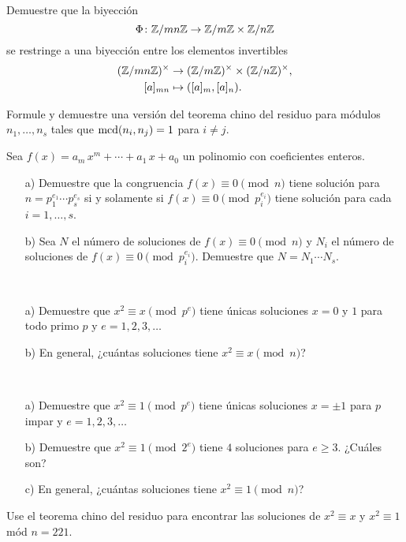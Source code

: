 \documentclass{article}
\begin{document}
\begin{problema}
  \label{probl:crt-invertibles}
  Demuestre que la biyección
  $$\Phi\colon \mathbb{Z}/mn\mathbb{Z} \to \mathbb{Z}/m\mathbb{Z} \times \mathbb{Z}/n\mathbb{Z}$$
  se restringe a una biyección entre los elementos invertibles
  \begin{align*}
    (\mathbb{Z}/mn\mathbb{Z})^\times & \to (\mathbb{Z}/m\mathbb{Z})^\times \times (\mathbb{Z}/n\mathbb{Z})^\times, \\
    [a]_{mn} & \mapsto ([a]_m, [a]_n).
  \end{align*}
\end{problema}

\begin{problema}
  Formule y demuestre una versión del teorema chino del residuo para módulos
  $n_1, \ldots, n_s$ tales que $\operatorname{mcd} (n_i,n_j) = 1$ para $i \ne j$.
\end{problema}

\begin{problema}
  Sea $f (x) = a_m\,x^m + \cdots + a_1\,x + a_0$ un polinomio con coeficientes
  enteros.

  \begin{enumerate}
  \item[a)] Demuestre que la congruencia $f (x) \equiv 0 \pmod{n}$ tiene
    solución para $n = p_1^{e_1} \cdots p_s^{e_s}$ si y solamente si
    $f (x) \equiv 0 \pmod{p_i^{e_i}}$ tiene solución para cada $i = 1,\ldots,s$.

  \item[b)] Sea $N$ el número de soluciones de $f (x) \equiv 0 \pmod{n}$ y $N_i$
    el número de soluciones de $f (x) \equiv 0 \pmod{p_i^{e_i}}$. Demuestre que
    $N = N_1 \cdots N_s$.
  \end{enumerate}
\end{problema}

\begin{problema}
  ~

  \begin{enumerate}
  \item[a)] Demuestre que $x^2 \equiv x \pmod{p^e}$ tiene únicas soluciones
    $x = 0$ y $1$ para todo primo $p$ y $e = 1,2,3,\ldots$

  \item[b)] En general, ¿cuántas soluciones tiene $x^2 \equiv x \pmod{n}$?
  \end{enumerate}
\end{problema}

\begin{problema}
  ~

  \begin{enumerate}
  \item[a)] Demuestre que $x^2 \equiv 1 \pmod{p^e}$ tiene únicas soluciones
    $x = \pm 1$ para $p$ impar y $e = 1,2,3,\ldots$

  \item[b)] Demuestre que $x^2 \equiv 1 \pmod{2^e}$ tiene $4$ soluciones para
    $e \ge 3$. ¿Cuáles son?

  \item[c)] En general, ¿cuántas soluciones tiene $x^2 \equiv 1 \pmod{n}$?
  \end{enumerate}
\end{problema}

\begin{problema}
  Use el teorema chino del residuo para encontrar las soluciones de
  $x^2 \equiv x$ y $x^2 \equiv 1$ mód $n = 221$.
\end{problema}
\end{document}
